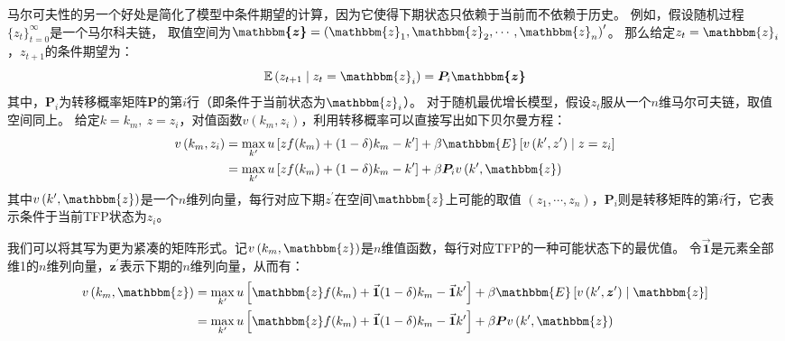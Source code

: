 马尔可夫性的另一个好处是简化了模型中条件期望的计算，因为它使得下期状态只依赖于当前而不依赖于历史。
例如，假设随机过程$\{z_t\}_{t=0}^{\infty}$是一个马尔科夫链，
取值空间为$\boldsymbol{\mathbbm{z}}=\left(\mathbbm{z}_1,\mathbbm{z}_2,\cdots,\mathbbm{z}_n\right)^{\prime}$。
那么给定$z_t=\mathbbm{z}_i$，$z_{t+1}$的条件期望为：
\begin{equation}
    \mathbb{E}\left(z_{t+1} \mid z_t=\mathbbm{z}_i\right) = \boldsymbol{P}_i\boldsymbol{\mathbbm{z}}
\end{equation}
其中，$\boldsymbol{P}_i$为转移概率矩阵$\boldsymbol{P}$的第$i$行（即条件于当前状态为$\mathbbm{z}_i$）。
对于随机最优增长模型，假设$z_t$服从一个$n$维马尔可夫链，取值空间同上。
给定$k=k_m,~z=z_i$，对值函数$v\left(k_m,z_i\right)$，利用转移概率可以直接写出如下贝尔曼方程：
\begin{equation*}
    \begin{aligned}
        v\left(k_m,z_i\right) &= \max_{k^{\prime}}u\left[zf(k_m)+(1-\delta)k_m-k^{\prime}\right] + 
            \beta\mathbbm{E}\left[v\left(k^{\prime},z^{\prime}\right)\mid z=z_i\right] \\
        &= \max_{k^{\prime}}u\left[zf(k_m)+(1-\delta)k_m-k^{\prime}\right] +
            \beta\boldsymbol{P}_i v\left(k^{\prime},\mathbbm{z}\right)
    \end{aligned}
\end{equation*}
其中$v\left(k^{\prime},\mathbbm{z}\right)$是一个$n$维列向量，每行对应下期$z^{\prime}$在空间$\mathbbm{z}$上可能的取值
$\left(z_1,\cdots,z_n\right)$，$\boldsymbol{P}_i$则是转移矩阵的第$i$行，它表示条件于当前TFP状态为$z_i$。

我们可以将其写为更为紧凑的矩阵形式。记$v\left(k_m,\mathbbm{z}\right)$是$n$维值函数，每行对应TFP的一种可能状态下的最优值。
令$\vec{\boldsymbol{1}}$是元素全部维1的$n$维列向量，$\boldsymbol{z}^{\prime}$表示下期的$n$维列向量，从而有：
\begin{equation*}
    \begin{aligned}
        v\left(k_m,\mathbbm{z}\right) 
        &= \max_{k^{\prime}}u\left[\mathbbm{z}f(k_m)+\vec{\boldsymbol{1}}(1-\delta)k_m-\vec{\boldsymbol{1}}k^{\prime}\right] + 
            \beta\mathbbm{E}\left[v\left(k^{\prime},\boldsymbol{z}^{\prime}\right)\mid \mathbbm{z}\right] \\
        &= \max_{k^{\prime}}u\left[\mathbbm{z}f(k_m)+\vec{\boldsymbol{1}}(1-\delta)k_m-\vec{\boldsymbol{1}}k^{\prime}\right] +
            \beta\boldsymbol{P} v\left(k^{\prime},\mathbbm{z}\right)
    \end{aligned}
\end{equation*}


